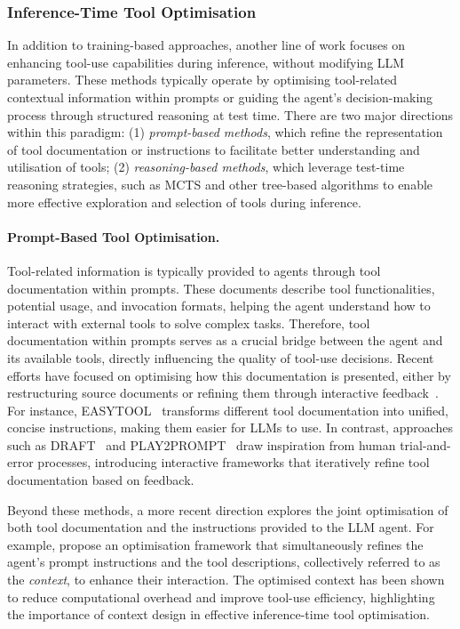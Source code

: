 \documentclass[]{selfevolagent}
\theoremstyle{plain}
\theoremstyle{definition}
\theoremstyle{remark}
\begin{document}
\subsubsection{Inference-Time Tool Optimisation}
In addition to training-based approaches, another line of work focuses on enhancing tool-use capabilities during inference, without modifying LLM parameters. These methods typically operate by optimising tool-related contextual information within prompts or guiding the agent's decision-making process through structured reasoning at test time. There are two major directions within this paradigm: (1) \textit{prompt-based methods}, which refine the representation of tool documentation or instructions to facilitate better understanding and utilisation of tools; (2) \textit{reasoning-based methods}, which leverage test-time reasoning strategies, such as MCTS and other tree-based algorithms to enable more effective exploration and selection of tools during inference. 

\paragraph{Prompt-Based Tool Optimisation.}
Tool-related information is typically provided to agents through tool documentation within prompts. These documents describe tool functionalities, potential usage, and invocation formats, helping the agent understand how to interact with external tools to solve complex tasks.  Therefore, tool documentation within prompts serves as a crucial bridge between the agent and its available tools, directly influencing the quality of tool-use decisions. Recent efforts have focused on optimising how this documentation is presented, either by restructuring source documents or refining them through interactive feedback~\citep{qu2025from}. For instance, EASYTOOL~\citep{yuan-etal-2025-easytool} transforms different tool documentation into unified, concise instructions, making them easier for LLMs to use. In contrast, approaches such as DRAFT~\citep{qu2025from} and PLAY2PROMPT~\citep{fang2025play2prompt} draw inspiration from human trial-and-error processes, introducing interactive frameworks that iteratively refine tool documentation based on feedback. 

Beyond these methods, a more recent direction explores the joint optimisation of both tool documentation and the instructions provided to the LLM agent. For example, \cite{wu2025joint} propose an optimisation framework that simultaneously refines the agent's prompt instructions and the tool descriptions, collectively referred to as the \textit{context}, to enhance their interaction. The optimised context has been shown to reduce computational overhead and improve tool-use efficiency, highlighting the importance of context design in effective inference-time tool optimisation. 
\end{document}
